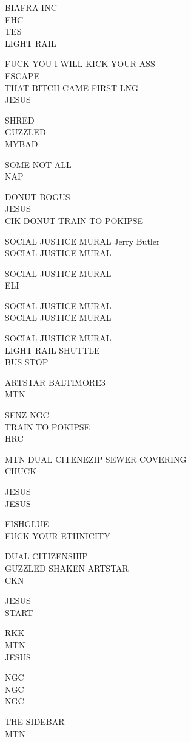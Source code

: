 \documentclass[10pt,letterpaper]{article}
\begin{document}
BIAFRA INC\\
EHC\\
TES\\
LIGHT RAIL

FUCK YOU I WILL KICK YOUR ASS\\
ESCAPE\\
THAT BITCH CAME FIRST LNG\\
JESUS

SHRED\\
GUZZLED\\
MYBAD

SOME NOT ALL\\
NAP

DONUT BOGUS\\
JESUS\\
CIK DONUT TRAIN TO POKIPSE

SOCIAL JUSTICE MURAL Jerry Butler\\
SOCIAL JUSTICE MURAL

SOCIAL JUSTICE MURAL\\
ELI

SOCIAL JUSTICE MURAL\\
SOCIAL JUSTICE MURAL

SOCIAL JUSTICE MURAL\\
LIGHT RAIL SHUTTLE\\
BUS STOP

ARTSTAR BALTIMORE3\\
MTN

SENZ NGC\\
TRAIN TO POKIPSE\\
HRC

MTN DUAL CITENEZIP SEWER COVERING\\
CHUCK

JESUS\\
JESUS

FISHGLUE\\
FUCK YOUR ETHNICITY

DUAL CITIZENSHIP\\
GUZZLED SHAKEN ARTSTAR\\
CKN

JESUS\\
START

RKK\\
MTN\\
JESUS

NGC\\
NGC\\
NGC

THE SIDEBAR\\
MTN
\end{document}
